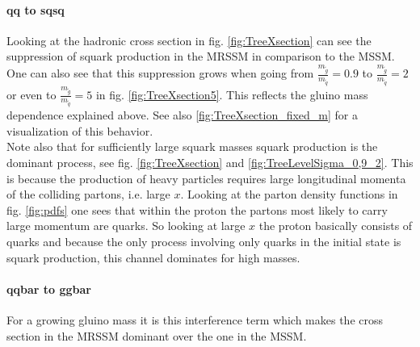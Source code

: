 \paragraph{qq to sqsq} Looking at the hadronic cross section in fig. \ref{fig:TreeXsection} can see the suppression of squark production in the MRSSM in comparison to the MSSM. One can also see that this suppression grows when going from $\frac{m_{\tilde{g}}}{m_{\tilde{q}}} = 0.9$ to  $\frac{m_{\tilde{g}}}{m_{\tilde{q}}} = 2$ or even to  $\frac{m_{\tilde{g}}}{m_{\tilde{q}}} = 5$ in fig. \ref{fig:TreeXsection5}. This reflects the gluino mass dependence explained above. See also \ref{fig:TreeXsection_fixed_m} for a visualization of this behavior.\\
Note also that for sufficiently large squark masses squark production is the dominant process, see fig. \ref{fig:TreeXsection} and \ref{fig:TreeLevelSigma_0,9_2}. This is because the production of heavy particles requires large longitudinal momenta of the colliding partons, i.e. large $x$. Looking at the parton density functions in fig. \ref{fig:pdfs} one sees that within the proton the partons most likely to carry large momentum are quarks. So looking at large $x$ the proton basically consists of quarks and because the only process involving only quarks in the initial state is squark production, this channel dominates for high masses.
\paragraph{qqbar to ggbar}
For a growing gluino mass it is this interference term which makes the cross section in the MRSSM dominant over the one in the MSSM.



